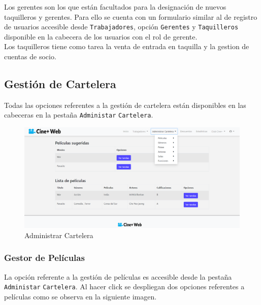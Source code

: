 Los gerentes son los que est\'an facultados para la designación de nuevos taquilleros y gerentes. Para ello se cuenta con un formulario similar al de registro de usuarios accesible desde \verb|Trabajadores|, opci\'on \verb|Gerentes| y \verb|Taquilleros| disponible en la cabecera de los usuarios con el rol de gerente.\\

Los taquilleros tiene como tarea la venta de entrada en taquilla y la gestion de cuentas de socio.

\subsection{Gestión de Cartelera}

Todas las opciones referentes a la gestión de cartelera est\'an disponibles en las cabeceras en la pesta\~na \verb*|Administar| \verb*|Cartelera|.\\

\begin{figure}[h!]
	\centering
	\includegraphics[scale=0.35]{./chapters/img/cartelera.png}
	
	\label{fig:cartelera}
	\caption{Administrar Cartelera}
	
\end{figure}

\subsubsection{Gestor de Pel\'iculas}
La opci\'on referente a la gesti\'on de pel\'iculas es accesible desde la pesta\~na \verb*|Administar| \verb*|Cartelera|. Al hacer click se despliegan dos opciones referentes a pel\'iculas como se observa en la siguiente imagen.

